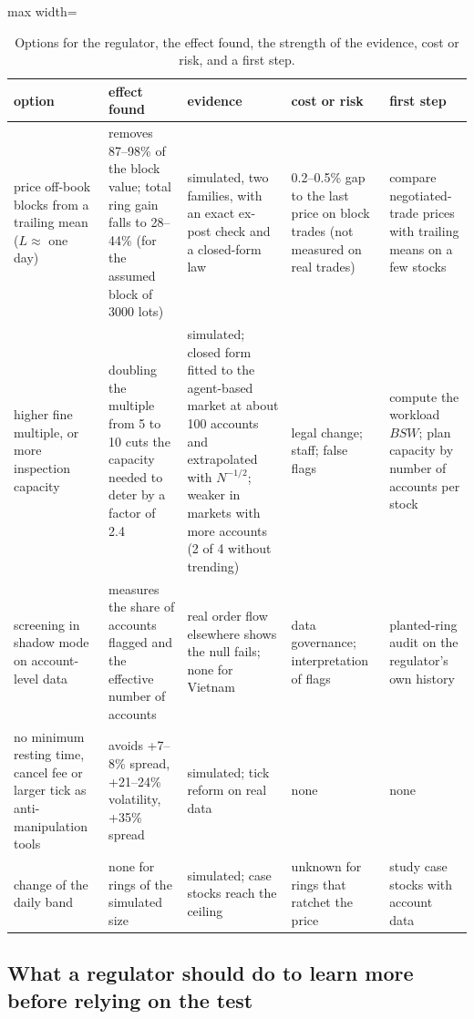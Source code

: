 \begin{table}[t]
\centering\footnotesize
\begin{adjustbox}{max width=\linewidth}
\begin{tabular}{p{2.7cm}p{3.3cm}p{2.5cm}p{3.0cm}p{2.9cm}}
\toprule
option & effect found & evidence & cost or risk & first step\\
\midrule
price off-book blocks from a trailing mean ($L\approx$ one day) & removes 87--98\% of the block value; total ring gain falls to 28--44\% (for the assumed block of 3000 lots) & simulated, two families, with an exact ex-post check and a closed-form law & 0.2--0.5\% gap to the last price on block trades (not measured on real trades) & compare negotiated-trade prices with trailing means on a few stocks\\
higher fine multiple, or more inspection capacity & doubling the multiple from 5 to 10 cuts the capacity needed to deter by a factor of 2.4 & simulated; closed form fitted to the agent-based market at about 100 accounts and extrapolated with $N^{-1/2}$; weaker in markets with more accounts (2 of 4 without trending) & legal change; staff; false flags & compute the workload $BSW$; plan capacity by number of accounts per stock\\
screening in shadow mode on account-level data & measures the share of accounts flagged and the effective number of accounts & real order flow elsewhere shows the null fails; none for Vietnam & data governance; interpretation of flags & planted-ring audit on the regulator's own history\\
no minimum resting time, cancel fee or larger tick as anti-manipulation tools & avoids +7--8\% spread, +21--24\% volatility, +35\% spread & simulated; tick reform on real data & none & none\\
change of the daily band & none for rings of the simulated size & simulated; case stocks reach the ceiling & unknown for rings that ratchet the price & study case stocks with account data\\
\bottomrule
\end{tabular}
\end{adjustbox}
\caption{Options for the regulator, the effect found, the strength of the evidence, cost or risk, and a first step.}\label{tab:options}
\end{table}

\subsection{What a regulator should do to learn more before relying on the test}

